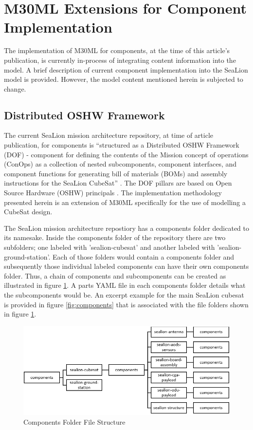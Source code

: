 \documentclass[journal,article,submit,pdftex,moreauthors]{Definitions/mdpi}
\begin{document}
\section{M30ML Extensions for Component Implementation}
The implementation of M30ML for components, at the time of this article's publication, is currently in-process of integrating content information into the model.  A brief description of current component implementation into the SeaLion model is provided.  However, the model content mentioned herein is subjected to change.

\subsection{Distributed OSHW Framework}
  The current SeaLion mission architecture repository, at time of article publication, for components is “structured as a Distributed OSHW Framework (DOF) - component for defining the contents of the Mission concept of operations (ConOps) as a collection of nested subcomponents, component interfaces, and component functions for generating bill of materials (BOMs) and assembly instructions for the SeaLion CubeSat” \cite{sealion_mission_architecture}.  The DOF pillars are based on Open Source Hardware (OSHW) principals \cite{mach30_git}.  The implementation methodology presented herein is an extension of M30ML specifically for the use of modelling a CubeSat design.  
  
  The SeaLion mission architecture repostiory has a components folder dedicated to its namesake.  Inside the components folder of the repository there are two subfolders; one labeled with 'sealion-cubesat' and another labeled with 'sealion-ground-station'.  Each of those folders would contain a components folder and subsequently those individual labeled components can have their own components folder.  Thus, a chain of components and subcomponents can be created as illustrated in figure \ref{fig:components_file}.  A parts YAML file in each components folder details what the subcomponents would be.  An excerpt example for the main SeaLion cubesat is provided in figure \ref{fig:components} that is associated with the file folders shown in figure \ref{fig:components_file}.

\begin{figure}[H]
    \includegraphics[width=10.5 cm]{assets/components_file.png}
    \caption{Components Folder File Structure}
	\label{fig:components_file}
    \end{figure}   
\unskip
\end{document}
